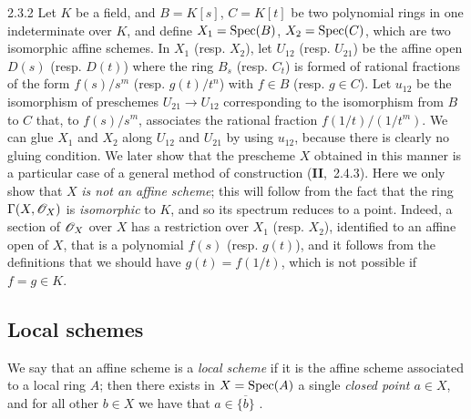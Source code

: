\begin{env}[Example]{2.3.2}
\label{1.2.3.2}
Let $K$ be a field, and $B=K[s]$, $C=K[t]$ be two polynomial rings in one indeterminate over
$K$, and define $X_1={\mathop{\mathrm{Spec}}\nolimits}(B)$, $X_2={\mathop{\mathrm{Spec}}\nolimits}(C)$, which are two isomorphic affine schemes. In
$X_1$ (resp. $X_2$), let $U_{12}$ (resp. $U_{21}$) be the affine open $D(s)$ (resp. $D(t)$)
where the ring $B_s$ (resp. $C_t$) is formed of rational fractions of the form $f(s)/s^m$
(resp. $g(t)/t^n$) with $f\in B$ (resp. $g\in C$). Let $u_{12}$ be the isomorphism of
preschemes $U_{21}\to U_{12}$ corresponding  to the isomorphism from $B$ to
$C$ that, to $f(s)/s^m$, associates the rational fraction $f(1/t)/(1/t^m)$. We can glue $X_1$
and $X_2$ along $U_{12}$ and $U_{21}$ by using $u_{12}$, because there is clearly no gluing
condition. We later show that the prescheme $X$ obtained in this manner is a particular case
of a general method of construction (\textbf{II},~2.4.3). Here we only show that $X$ {\em is
not an affine scheme}; this will follow from the fact that the ring $\Gamma(X,\mathscr{O}_X)$ is
{\em isomorphic} to $K$, and so its spectrum reduces to a point. Indeed, a section of
$\mathscr{O}_X$ over $X$ has a restriction over $X_1$ (resp. $X_2$), identified to an affine open of
$X$, that is a polynomial $f(s)$ (resp. $g(t)$), and it follows from the definitions that we
should have $g(t)=f(1/t)$, which is not possible if $f=g\in K$.
\end{env}

\subsection{Local schemes}
\label{subsection-local-schemes}

\begin{env}[2.4.1]
\label{1.2.4.1}
We say that an affine scheme is a {\em local scheme} if
it is the affine scheme associated to a local ring $A$; then there exists in
$X={\mathop{\mathrm{Spec}}\nolimits}(A)$ a single {\em closed point $a\in X$}, and for all other $b\in X$
we have that $a\in\overline{\{b\}}$ .
\end{env}

